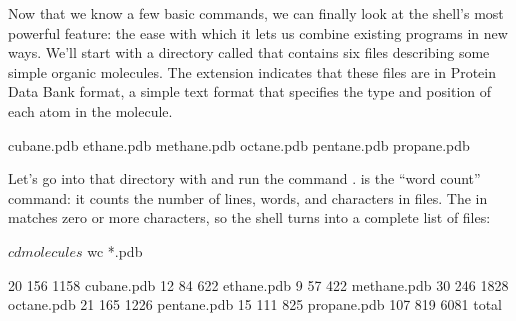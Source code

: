 Now that we know a few basic commands, we can finally look at the
shell's most powerful feature: the ease with which it lets us combine
existing programs in new ways. We'll start with a directory called
 that contains six files describing some simple
organic molecules. The  extension indicates that these
files are in Protein Data Bank format, a simple text format that
specifies the type and position of each atom in the molecule.


\begin{VerbOut}
cubane.pdb    ethane.pdb    methane.pdb
octane.pdb    pentane.pdb   propane.pdb
\end{VerbOut}

Let's go into that directory with  and run the command
.  is the ``word count'' command: it counts
the number of lines, words, and characters in files. The \code{*} in
 matches zero or more characters, so the shell turns
 into a complete list of  files:

\begin{VerbIn}
$ cd molecules
$ wc *.pdb
\end{VerbIn}

\begin{VerbOut}
  20  156 1158 cubane.pdb
  12   84  622 ethane.pdb
   9   57  422 methane.pdb
  30  246 1828 octane.pdb
  21  165 1226 pentane.pdb
  15  111  825 propane.pdb
 107  819 6081 total
\end{VerbOut}

